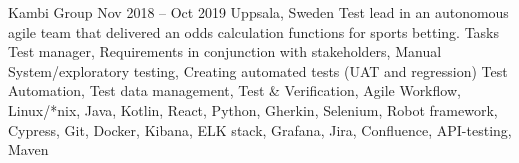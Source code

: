 \documentclass{sobCV}[2015/09/08]
\begin{document}
{Kambi Group}
{Nov 2018 -- Oct 2019}
{Uppsala, Sweden}{
	Test lead in an autonomous agile team that delivered an odds calculation
	functions for sports betting.
}
{Tasks}{
	Test manager,
	Requirements in conjunction with stakeholders,
	Manual System/exploratory testing,
	Creating automated tests (UAT and regression)
}{  %
}{
	Test Automation,
	Test data management,
	Test \& Verification,
	Agile Workflow,
	Linux/*nix,
	Java,
	Kotlin,
	React,
	Python,
	Gherkin,
	Selenium,
	Robot framework,
	Cypress,
	Git,
	Docker,
	Kibana,
	ELK stack,
	Grafana,
	Jira,
	Confluence,
	API-testing,
	Maven
}
\end{document}
